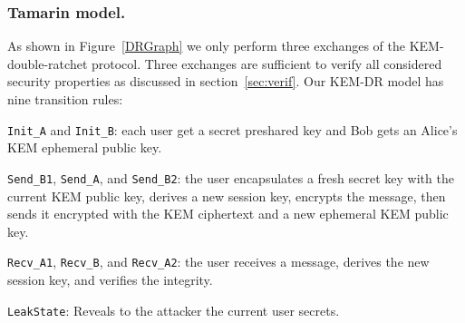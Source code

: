 \subsubsection{Tamarin model.} As shown in Figure~\ref{DRGraph} we only perform three exchanges of the KEM-double-ratchet protocol. Three exchanges are sufficient to verify all considered security properties as discussed in section~\ref{sec:verif}. Our KEM-DR model has nine transition rules:
\begin{compactitem}
\item \texttt{Init\_A} and \texttt{Init\_B}: each user get a secret preshared key and Bob gets an Alice's KEM ephemeral public key.
\item \texttt{Send\_B1}, \texttt{Send\_A}, and \texttt{Send\_B2}: the user encapsulates a fresh secret key with the current KEM public key, derives a new session key, encrypts the message, then sends it encrypted with the KEM ciphertext and a new ephemeral KEM public key.
\item \texttt{Recv\_A1}, \texttt{Recv\_B}, and \texttt{Recv\_A2}: the user receives a message, derives the new session key, and verifies the integrity.
\item \texttt{LeakState}: Reveals to the attacker the current user secrets.
\end{compactitem}
